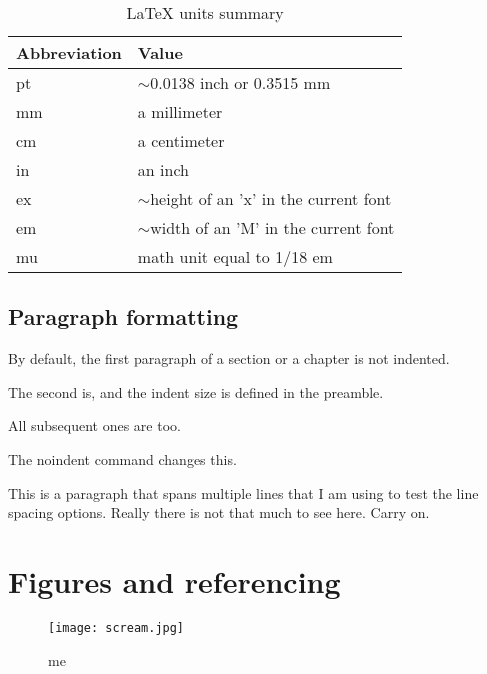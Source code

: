 \documentclass[12pt, letterpaper]{article} %
\begin{document}
\begin{table}[!h]
	\centering
	\begin{tabular}{|l|l|}
		\hline
		Abbreviation & Value                                      \\ \hline
		pt           & $\sim$0.0138 inch or 0.3515 mm             \\ \hline
		mm           & a millimeter                               \\ \hline
		cm           & a centimeter                               \\ \hline
		in           & an inch                                    \\ \hline
		ex           & $\sim$height of an 'x' in the current font \\ \hline
		em           & $\sim$width of an 'M' in the current font  \\ \hline
		mu           & math unit equal to 1/18 em                 \\ \hline
	\end{tabular}
	\caption{LaTeX units summary}
	\label{table:units}
\end{table}

\subsection*{Paragraph formatting}

By default, the first paragraph of a section or a chapter is not indented.

The second is, and the indent size is defined in the preamble.

All subsequent ones are too.

\noindent The noindent command changes this.\par

This is a paragraph that spans multiple lines that I am using 
to test the line spacing options. 
Really there is not that much to see here. Carry on.

\clearpage
\section{Figures and referencing} \label{sec:fig} %

\begin{figure}[h] %
    \centering %
    \texttt{[image: scream.jpg]} %
    \caption{me} %
    \label{fig:scream} %
\end{figure}
\end{document}
